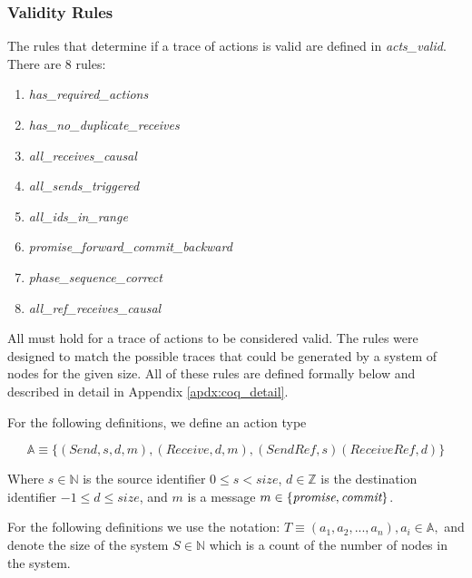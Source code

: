 \documentclass[runningheads]{llncs}
\newcommand{\action}{\mathds{A}}
\newcommand{\promise}{\emph{promise}}
\newcommand{\commit}{\emph{commit}}
\begin{document}
\subsubsection{Validity Rules} \label{sec:validity_rules}
The rules that determine if a trace of actions is valid are defined in \emph{acts\_valid}. There are 8 rules:

\begin{enumerate}
  \itemsep 0pt
  \item \emph{has\_required\_actions}
  \item \emph{has\_no\_duplicate\_receives}
  \item \emph{all\_receives\_causal}
  \item \emph{all\_sends\_triggered}
  \item \emph{all\_ids\_in\_range}
  \item \emph{promise\_forward\_commit\_backward}
  \item \emph{phase\_sequence\_correct}
  \item \emph{all\_ref\_receives\_causal}
\end{enumerate}

All must hold for a trace of actions to be considered valid. The rules were designed to match the possible traces that could be generated by a system of nodes for the given size. All of these rules are defined formally below and described in detail in Appendix \ref{apdx:coq_detail}.

For the following definitions, we define an action type 
\begin{definition}
$$\action \equiv \{(Send, s, d, m), (Receive, d, m), (SendRef, s) (ReceiveRef, d)\}$$

Where $s \in \mathds{N}$ is the source identifier $0 \le s < size$, $d \in \mathds{Z}$ is the destination identifier $-1 \le d \le size$, and $m$ is a message $m \in \{\promise, \commit\}$.

\end{definition}
For the following definitions we use the notation: 
$T \equiv (a_1, a_2, ..., a_n), a_i \in \action,$ and denote the size of the system $S \in \mathds{N}$ which is a count of the number of nodes in the system.
\end{document}
